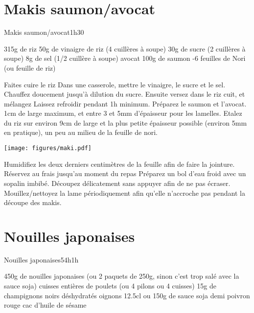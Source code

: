{\section{Makis saumon/avocat}
\begin{recette}{Makis saumon/avocat}{}{1h30}{}
\begin{ingredients}
\ingredient 315g de riz %
\ingredient 50g de vinaigre de riz (4 cuillères à soupe)
\ingredient 30g de sucre (2 cuillères à soupe)
\ingredient 8g de sel (1/2 cuillère à soupe)
 avocat
\ingredient 100g de saumon
-6 feuilles de Nori (ou feuille de riz)
\end{ingredients}

\begin{preparation}
\etape Faites cuire le riz
\etape Dans une casserole, mettre le vinaigre, le sucre et le sel. Chauffez doucement jusqu'à dilution du sucre.
\etape Ensuite versez dans le riz cuit, et mélangez
\etape Laissez refroidir pendant 1h minimum.
\etape Préparez le saumon et l'avocat. 1cm de large maximum, et entre 3 et 5mm d'épaisseur pour les lamelles. 
\etape Etalez du riz sur environ 9cm de large et la plus petite épaisseur possible (environ 5mm en pratique), un peu au milieu de la feuille de nori. 
\begin{center}
\texttt{[image: figures/maki.pdf]}
\end{center}
\etape Humidifiez les deux derniers centimètres de la feuille afin de faire la jointure.
\etape Réservez au frais jusqu'au moment du repas
\etape Préparez un bol d'eau froid avec un sopalin imbibé. Découpez délicatement sans appuyer afin de ne pas écraser. Mouillez/nettoyez la lame périodiquement afin qu'elle n'accroche pas pendant la découpe des makis.  
\end{preparation}
\end{recette}

\section{Nouilles japonaises}
\begin{recette}{Nouilles japonaises}{5}{4h}{1h}
\begin{ingredients}
\ingredient 450g de nouilles japonaises (ou 2 paquets de 250g, sinon c'est trop salé avec la sauce soja)
 cuisses entières de poulets (ou 4 pilons ou 4 cuisses)
\ingredient 15g de champignons noirs déshydratés
 oignons
\ingredient 12.5cl ou 150g de sauce soja 
 demi poivron rouge
 cac d'huile de sésame
\end{ingredients}


\end{recette}}
